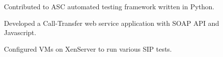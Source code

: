 \documentclass[a4paper]{lyu-resume} %
\begin{document}
\begin{minipage}[t]{0.66\textwidth}
\sectionspace %


\begin{tightitemize}
\item Contributed to ASC automated testing framework written in Python.
\item Developed a Call-Transfer web service application with SOAP API and Javascript.
\item Configured VMs on XenServer to run various SIP tests.
\end{tightitemize}




\sectionspace %
\end{minipage} %
\end{document}

